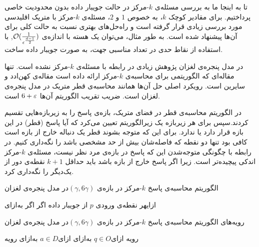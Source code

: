 تا به اینجا ما به بررسی مسئله‌ی $k$-مرکز در حالت جویبار داده بدون محدودیت خاصی پرداختیم.
برای مقادیر کوچک $k$، به خصوص $1$ و $2$، مسئله‌ی $k$-مرکز با متریک اقلیدسی مورد بررسی زیادی قرار گرفته است و راه‌حل‌های بهتری نسبت به حالت کلی برای آن‌ها پیشنهاد شده است.
به طور مثال، می‌توان یک هسته با اندازه‌ی $\mathcal{O}(\frac{1}{\epsilon^{\frac{d-1}{2}}})$, با استفاده از نقاط حدی در تعداد مناسبی جهت، به صورت جویبار داده ساخت. 

در مدل پنجره‌ی لغزان پژوهش زیادی در رابطه با مسئله‌ی $k$-مرکز نشده است. تنها مقاله‌ای که الگوریتمی برای محاسبه‌ی $k$-مرکز ارائه داده است مقاله‌ی کهن‌ادد و سایرین  است. رویکرد اصلی حل آن‌ها همانند محاسبه‌ی قطر متریک در مدل پنجره‌ی لغزان است. ضریب تقریب الگوریتم آن‌ها $6+\varepsilon$ است.

در الگوریتم محاسبه‌ی قطر در فضای متریک، بازه‌ی پاسخ را به زیربازه‌هایی تقسیم کردند.سپس برای هر زیربازه یک زیرالگوریتم تعیین می‌کرد که آیا پاسخ (قطر) در این بازه قرار دارد یا ندارد. برای این که متوجه بشوند قطر یک دنباله خارج از بازه است کافی بود تنها دو نقطه که فاصله‌‌شان بیش از حد مشخصی باشد را نگه‌داری کنیم. در رابطه با چگونگی متوجه‌شدن این که پاسخ در بازه‌ی مرد نظر نیست، مسئله‌ی $k$-مرکز اندکی پیچیده‌تر است. زیرا اگر پاسخ خارج از بازه باشد باید حداقل $k+1$ نقطه‌ی دور از یک‌دیگر را نگه‌داری کرد. 

\caption
{الگوریتم محاسبه‌ی پاسخ $k$-مرکز در بازه‌ی $(\gamma, 6 \gamma) $در مدل پنجره‌ی لغزان }
‌ازای{هر نقطه‌ی ورودی $p$ از جویبار داده}
‌اگر{}
‌اگر{}
‌به‌ازای{}

\caption
{رویه‌های الگوریتم محاسبه‌ی پاسخ $k$-مرکز در بازه‌ی $(\gamma, 6 \gamma) $در مدل پنجره‌ی لغزان}

‌رویه{}
\EndIf{}
‌ازای{$q \in O$}
\EndIf{}
‌به‌ازای{}
\EndIf{}
\Else{}
‌ازای{$a \in D$}
‌به‌ازای{}
\EndIf{}
‌رویه{}

